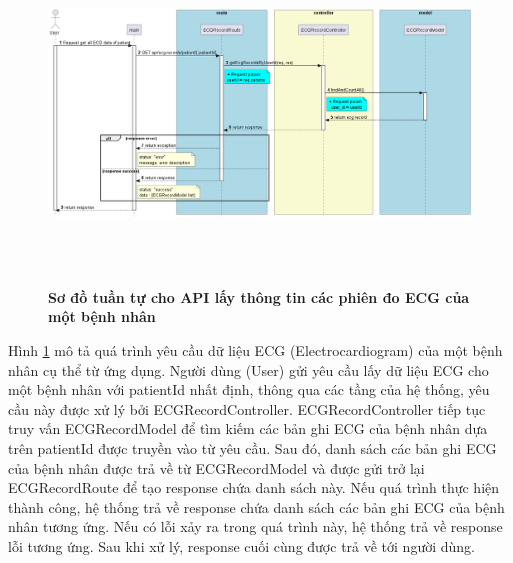 \begin{enumerate}[a)]
\begin{figure}[H]
  \centering
  \includegraphics[width=16cm,height=9cm]{Images/server/sequence/server/getEcgRecordsByUserId.png}
  \caption[Sơ đồ tuần tự cho API lấy thông tin các phiên đo ECG của một bệnh nhân]{\bfseries \fontsize{12pt}{0pt}
  \selectfont Sơ đồ tuần tự cho API lấy thông tin các phiên đo ECG của một bệnh nhân }
  \label{getEcgRecordsByUserId} %
\end{figure}
Hình \ref{getEcgRecordsByUserId} mô tả quá trình yêu cầu dữ liệu ECG (Electrocardiogram) của một bệnh nhân cụ thể từ ứng dụng. Người dùng (User) gửi yêu cầu lấy dữ liệu ECG cho một bệnh nhân với patientId nhất định, thông qua các tầng của hệ thống, yêu cầu này được xử lý bởi ECGRecordController. ECGRecordController tiếp tục truy vấn ECGRecordModel để tìm kiếm các bản ghi ECG của bệnh nhân dựa trên patientId được truyền vào từ yêu cầu. Sau đó, danh sách các bản ghi ECG của bệnh nhân được trả về từ ECGRecordModel và được gửi trở lại ECGRecordRoute để tạo response chứa danh sách này. Nếu quá trình thực hiện thành công, hệ thống trả về response chứa danh sách các bản ghi ECG của bệnh nhân tương ứng. Nếu có lỗi xảy ra trong quá trình này, hệ thống trả về response lỗi tương ứng. Sau khi xử lý, response cuối cùng được trả về tới người dùng.



\end{enumerate}
